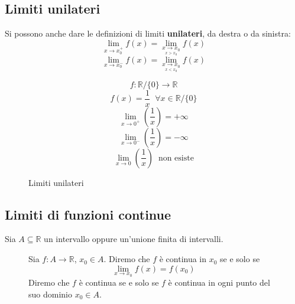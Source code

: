 \documentclass[a4paper]{article}
\theoremstyle{break}
\theoremstyle{break}
\theoremstyle{break}
\theoremstyle{break}
\begin{document}
\subsection{Limiti unilateri}
Si possono anche dare le definizioni di limiti \textbf{unilateri}, da destra o da sinistra:
\[
	\lim_{x \to x_0^+} f(x) = \lim_{\underset{x > x_0}{x \to x_0}} f(x)
\]
\[
	\lim_{x \to x_0^-} f(x) = \lim_{\underset{x < x_0}{x \to x_0}} f(x)
\]
\begin{example}
	\[
		f: \mathbb{R} / \{0\} \to \mathbb{R}
	\]
	\[
		f(x) = \frac{1}{x}\;\; \forall x \in \mathbb{R} / \{0\}
	\]
	\[
		\lim_{x \to 0^+} (\frac{1}{x}) = +\infty
	\]
	\[
		\lim_{x \to 0^-} (\frac{1}{x}) = -\infty
	\]
	\[
		\lim_{x \to 0} (\frac{1}{x})\;\; \text{non esiste}
	\]

	\begin{figure}[H]
		\begin{center}
		\end{center}
		\caption{Limiti unilateri}
	\end{figure}

\end{example}

\subsection{Limiti di funzioni continue}
Sia \( A \subseteq \mathbb{R} \) un intervallo oppure un'unione finita di intervalli.
\begin{figure}[H]
	\begin{definition}
		Sia \( f: A \to  \mathbb{R} \), \( x_0 \in A \). Diremo che \( f \) è continua in \( x_0 \)
		se e solo se
		\[
			\lim_{x \to x_0} f(x) = f(x_0)
		\]
		Diremo che \( f \) è continua se e solo se \( f \) è continua in ogni punto del suo dominio
		\( x_0 \in A \).
	\end{definition}
\end{figure}
\end{document}
